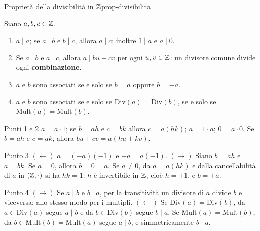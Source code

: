 \begin{concetto}
\begin{Proposizione}{Proprietà della divisibilità in $\mathbb{Z}$}{prop-divisibilita}
    \begin{prerequisiti}
    \end{prerequisiti}
    Siano $a, b, c \in \mathbb{Z}$.
    \begin{enumerate}
        \item $a \mid a$; se $a \mid b$ e $b \mid c$, allora $a \mid c$; inoltre $1 \mid a$ e $a \mid 0$.
        \item Se $a \mid b$ e $a \mid c$, allora $a \mid bu + cv$ per ogni $u, v \in \mathbb{Z}$: un divisore comune divide ogni \textbf{combinazione}.
        \item $a$ e $b$ sono associati se e solo se $b = a$ oppure $b = -a$.
        \item $a$ e $b$ sono associati se e solo se $\mathrm{Div}(a) = \mathrm{Div}(b)$, se e solo se $\mathrm{Mult}(a) = \mathrm{Mult}(b)$.
    \end{enumerate}
\end{Proposizione}
\begin{dimostrazione}
    \begin{caso}{Punti 1 e 2}
        $a = a \cdot 1$; se $b = ah$ e $c = bk$ allora $c = a(hk)$; $a = 1 \cdot a$; $0 = a \cdot 0$. Se $b = ah$ e $c = ak$, allora
        $bu + cv = a(hu + kv)$.
    \end{caso}
    \begin{caso}{Punto 3}
        $(\leftarrow)$ $a = (-a)(-1)$ e $-a = a(-1)$. $(\rightarrow)$ Siano $b = ah$ e $a = bk$. Se $a = 0$, allora $b = 0 = a$. Se $a \neq 0$, da
        $a = a(hk)$ e dalla cancellabilità di $a$ in $(\mathbb{Z}, \cdot)$ si ha $hk = 1$: $h$ è invertibile in $\mathbb{Z}$, cioè $h = \pm 1$, e $b = \pm a$.
    \end{caso}
    \begin{caso}{Punto 4}
        $(\rightarrow)$ Se $a \mid b$ e $b \mid a$, per la transitività un divisore di $a$ divide $b$ e viceversa; allo stesso modo per i multipli.
        $(\leftarrow)$ Se $\mathrm{Div}(a) = \mathrm{Div}(b)$, da $a \in \mathrm{Div}(a)$ segue $a \mid b$ e da $b \in \mathrm{Div}(b)$ segue $b \mid a$. Se
        $\mathrm{Mult}(a) = \mathrm{Mult}(b)$, da $b \in \mathrm{Mult}(b) = \mathrm{Mult}(a)$ segue $a \mid b$, e simmetricamente $b \mid a$.
    \end{caso}
\end{dimostrazione}
\end{concetto}

